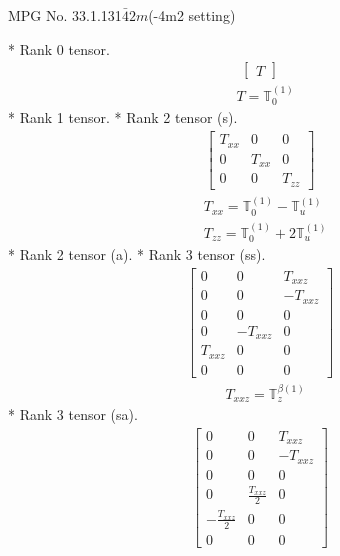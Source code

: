 \documentclass[fleqn,8pt,landscape]{jsarticle}
\begin{document}
\setcounter{MaxMatrixCols}{32}

\renewcommand{\tablename}{Table~}
\renewcommand{\figurename}{Figure~}
\begin{center}
\LARGE
MPG No. 33.1.131\quad$\bar{4}2m$\quad(-4m2 setting)
\end{center}
* Rank 0 tensor.
\begin{align*}
\begin{bmatrix} T \end{bmatrix}
\end{align*}
\begin{align*}
& T = \mathbb{T}_{0}^{(1)}
\end{align*}
* Rank 1 tensor.
* Rank 2 tensor (s).
\begin{align*}
\begin{bmatrix} T_{xx} & 0 & 0 \\ 0 & T_{xx} & 0 \\ 0 & 0 & T_{zz} \end{bmatrix}
\end{align*}
\begin{align*}
& T_{xx} = \mathbb{T}_{0}^{(1)} - \mathbb{T}_{u}^{(1)} \\
& T_{zz} = \mathbb{T}_{0}^{(1)} + 2 \mathbb{T}_{u}^{(1)}
\end{align*}
* Rank 2 tensor (a).
* Rank 3 tensor (ss).
\begin{align*}
\begin{bmatrix} 0 & 0 & T_{xxz} \\ 0 & 0 & - T_{xxz} \\ 0 & 0 & 0 \\ 0 & - T_{xxz} & 0 \\ T_{xxz} & 0 & 0 \\ 0 & 0 & 0 \end{bmatrix}
\end{align*}
\begin{align*}
& T_{xxz} = \mathbb{T}_{z}^{\beta(1)}
\end{align*}
* Rank 3 tensor (sa).
\begin{align*}
\begin{bmatrix} 0 & 0 & T_{xxz} \\ 0 & 0 & - T_{xxz} \\ 0 & 0 & 0 \\ 0 & \frac{T_{xxz}}{2} & 0 \\ - \frac{T_{xxz}}{2} & 0 & 0 \\ 0 & 0 & 0 \end{bmatrix}
\end{align*}
\end{document}
